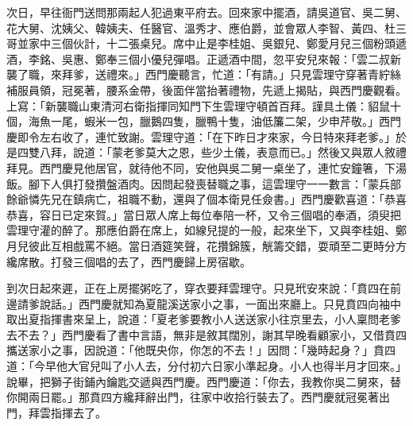 次日，早往衙門送問那兩起人犯過東平府去。回來家中擺酒，請吳道官、吳二舅、花大舅、沈姨父、韓姨夫、任醫官、溫秀才、應伯爵，並會眾人李智、黃四、杜三哥並家中三個伙計，十二張桌兒。席中止是李桂姐、吳銀兒、鄭愛月兒三個粉頭遞酒，李銘、吳惠、鄭奉三個小優兒彈唱。正遞酒中間，忽平安兒來報：「雲二叔新襲了職，來拜爹，送禮來。」西門慶聽言，忙道：「有請。」只見雲理守穿著青紵絲補服員領，冠冕著，腰系金帶，後面伴當抬著禮物，先遞上揭貼，與西門慶觀看。上寫：「新襲職山東清河右衛指揮同知門下生雲理守頓首百拜。謹具土儀：貂鼠十個，海魚一尾，蝦米一包，臘鵝四隻，臘鴨十隻，油低簾二架，少申芹敬。」西門慶即令左右收了，連忙致謝。雲理守道：「在下昨日才來家，今日特來拜老爹。」於是四雙八拜，說道：「蒙老爹莫大之恩，些少土儀，表意而已。」然後又與眾人敘禮拜見。西門慶見他居官，就待他不同，安他與吳二舅一桌坐了，連忙安鐘箸，下湯飯。腳下人俱打發攢盤酒肉。因問起發喪替職之事，這雲理守一一數言：「蒙兵部餘爺憐先兄在鎮病亡，祖職不動，還與了個本衛見任僉書。」西門慶歡喜道：「恭喜恭喜，容日已定來賀。」當日眾人席上每位奉陪一杯，又令三個唱的奉酒，須臾把雲理守灌的醉了。那應伯爵在席上，如線兒提的一般，起來坐下，又與李桂姐、鄭月兒彼此互相戲罵不絕。當日酒筵笑聲，花攢錦簇，觥籌交錯，耍頑至二更時分方纔席散。打發三個唱的去了，西門慶歸上房宿歇。

到次日起來遲，正在上房擺粥吃了，穿衣要拜雲理守。只見玳安來說：「賁四在前邊請爹說話。」西門慶就知為夏龍溪送家小之事，一面出來廳上。只見賁四向袖中取出夏指揮書來呈上，說道：「夏老爹要教小人送送家小往京里去，小人稟問老爹去不去？」西門慶看了書中言語，無非是敘其闊別，謝其早晚看顧家小，又借賁四攜送家小之事，因說道：「他既央你，你怎的不去！」因問：「幾時起身？」賁四道：「今早他大官兒叫了小人去，分付初六日家小準起身。小人也得半月才回來。」說畢，把獅子街鋪內鑰匙交遞與西門慶。西門慶道：「你去，我教你吳二舅來，替你開兩日罷。」那賁四方纔拜辭出門，往家中收拾行裝去了。西門慶就冠冕著出門，拜雲指揮去了。

